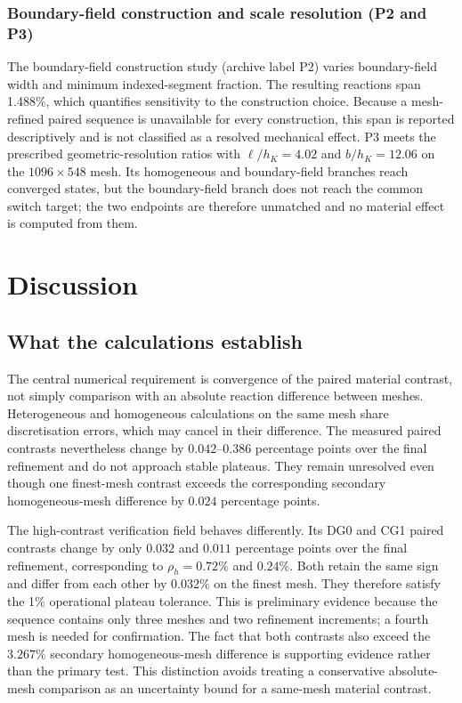 \documentclass[preprint,12pt]{elsarticle}
\begin{document}
\subsubsection*{Boundary-field construction and scale resolution (P2 and P3)}
The boundary-field construction study (archive label P2) varies boundary-field width and minimum indexed-segment fraction. The resulting reactions span 1.488\%, which quantifies sensitivity to the construction choice. Because a mesh-refined paired sequence is unavailable for every construction, this span is reported descriptively and is not classified as a resolved mechanical effect. P3
meets the prescribed geometric-resolution ratios with $\ell/h_K=4.02$ and $b/h_K=12.06$ on the
$1096\times548$ mesh. Its homogeneous and boundary-field branches reach converged states,
but the boundary-field branch does not reach the common switch target; the two endpoints
are therefore unmatched and no material effect is computed from them.

\section{Discussion}
\subsection{What the calculations establish}
The central numerical requirement is convergence of the paired material contrast,
not simply comparison with an absolute reaction difference between meshes.
Heterogeneous and homogeneous calculations on the same mesh share discretisation
errors, which may cancel in their difference. The measured paired contrasts nevertheless
change by \(0.042\)--\(0.386\) percentage points over the final refinement and
do not approach stable plateaus. They remain unresolved even though one
finest-mesh contrast exceeds the corresponding secondary homogeneous-mesh difference by
\(0.024\) percentage points.

The high-contrast verification field behaves differently. Its DG0 and CG1 paired
contrasts change by only \(0.032\) and \(0.011\) percentage points over the
final refinement, corresponding to \(\rho_h=0.72\%\) and \(0.24\%\). Both
retain the same sign and differ from each other by \(0.032\%\) on the finest
mesh. They therefore satisfy the 1\% operational plateau tolerance. This is
preliminary evidence because the sequence contains only three meshes and two
refinement increments; a fourth mesh is needed for confirmation. The fact that
both contrasts also exceed the \(3.267\%\) secondary homogeneous-mesh
difference is supporting evidence rather than the primary test. This distinction
avoids treating a conservative absolute-mesh
comparison as an uncertainty bound for a same-mesh material contrast.
\end{document}
